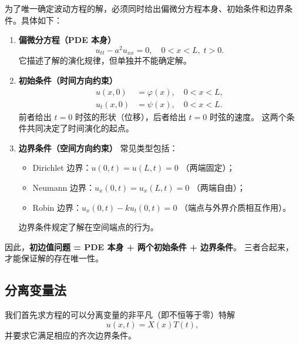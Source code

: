 \begin{proposition}[初边值问题的结构]
为了唯一确定波动方程的解，必须同时给出偏微分方程本身、初始条件和边界条件。具体如下：

\begin{enumerate}
  \item \textbf{偏微分方程（PDE 本身）}  
  \[
  u_{tt} - a^2 u_{xx} = 0, \quad 0<x<L,\; t>0.
  \]
  它描述了解的演化规律，但单独并不能确定解。

  \item \textbf{初始条件（时间方向约束）}  
  \begin{align*}
  u(x,0) &= \varphi(x), \quad 0<x<L, \\
  u_t(x,0) &= \psi(x), \quad 0<x<L.
  \end{align*}
  前者给出 $t=0$ 时弦的形状（位移），后者给出 $t=0$ 时弦的速度。  
  这两个条件共同决定了时间演化的起点。

  \item \textbf{边界条件（空间方向约束）}  
  常见类型包括：
  \begin{itemize}
    \item Dirichlet 边界：$u(0,t)=u(L,t)=0$ （两端固定）；  
    \item Neumann 边界：$u_x(0,t)=u_x(L,t)=0$ （两端自由）；  
    \item Robin 边界：$u_x(0,t)-k u_t(0,t)=0$ （端点与外界介质相互作用）。
  \end{itemize}
  边界条件规定了解在空间端点的行为。

\end{enumerate}

因此，\textbf{初边值问题 = PDE 本身 + 两个初始条件 + 边界条件}。  
三者合起来，才能保证解的存在唯一性。

\end{proposition}
\subsection{分离变量法}

我们首先求方程的可以分离变量的非平凡（即不恒等于零）特解
\[
u(x,t)=X(x)T(t),
\]
并要求它满足相应的齐次边界条件。

